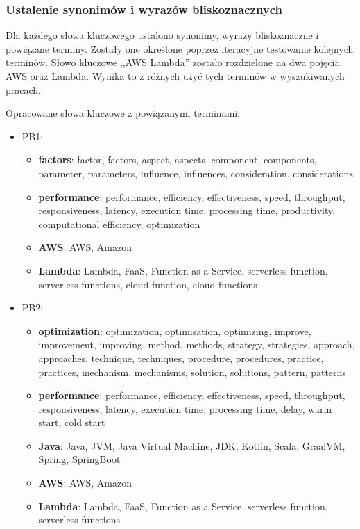 \subsubsection*{Ustalenie synonimów i wyrazów bliskoznacznych}

Dla każdego słowa kluczowego ustalono synonimy, wyrazy bliskoznaczne i powiązane terminy. 
Zostały one określone poprzez iteracyjne testowanie kolejnych terminów.
Słowo kluczowe ,,AWS Lambda'' zostało rozdzielone na dwa pojęcia: AWS oraz Lambda.
Wynika to z różnych użyć tych terminów w wyszukiwanych pracach.

Opracowane słowa kluczowe z powiązanymi terminami:

\begin{itemize}
    \item PB1:
    \begin{itemize}
        \item \textbf{factors}: factor, factors, aspect, aspects, component, components, parameter, parameters, influence, influences, consideration, considerations
        \item \textbf{performance}: performance, efficiency, effectiveness, speed, throughput, responsiveness, latency, execution time, processing time, productivity, computational efficiency, optimization
        \item \textbf{AWS}: AWS, Amazon
        \item \textbf{Lambda}: Lambda, FaaS, Function-as-a-Service, serverless function, serverless functions, cloud function, cloud functions
    \end{itemize}
    \item PB2:
    \begin{itemize}
        \item \textbf{optimization}: optimization, optimisation, optimizing, improve, improvement, improving, method, methods, strategy, strategies, approach, approaches, technique, techniques, procedure, procedures, practice, practices, mechanism, mechanisms, solution, solutions, pattern, patterns
        \item \textbf{performance}: performance, efficiency, effectiveness, speed, throughput, responsiveness, latency, execution time, processing time, delay, warm start, cold start
        \item \textbf{Java}: Java, JVM, Java Virtual Machine, JDK, Kotlin, Scala, GraalVM, Spring, SpringBoot
        \item \textbf{AWS}: AWS, Amazon
        \item \textbf{Lambda}: Lambda, FaaS, Function as a Service, serverless function, serverless functions

\end{itemize}
\end{itemize}
